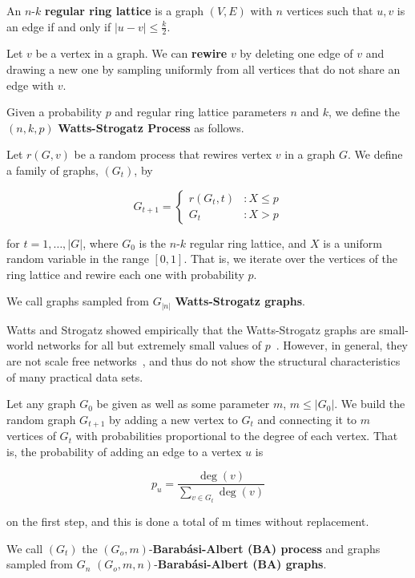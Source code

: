 \begin{definition}
  An $n$-$k$ \textbf{regular ring lattice} is a graph $(V, E)$ with $n$ vertices
  such that $u,v$ is an edge if and only if $|u-v| \leq \frac{k}{2}$.
\end{definition}

\begin{definition}
  Let $v$ be a vertex in a graph. We can \textbf{rewire} $v$ by deleting one
  edge of $v$ and drawing a new one by sampling uniformly from all vertices that
  do not share an edge with $v$.
\end{definition}

\begin{definition}
  Given a probability $p$ and regular ring lattice parameters $n$ and $k$, we
  define the $(n,k,p)$ \textbf{Watts-Strogatz Process} as follows.

  Let $r(G,v)$ be a random process that rewires vertex $v$ in a graph $G$. We
  define a family of graphs, $(G_t)$, by

  \[
    G_{t+1} = \left\{
      \begin{array}{lc}
        r(G_t,t) &: X \leq p \\
        G_t &: X > p
      \end{array}
    \right.
  \]

  for $t = 1,\dots, |G|$, where $G_0$ is the $n$-$k$ regular ring lattice, and
  $X$ is a uniform random variable in the range $[0,1]$. That is, we iterate
  over the vertices of the ring lattice and rewire each one with probability
  $p$.

  We call graphs sampled from $G_{|n|}$ \textbf{Watts-Strogatz graphs}.
\end{definition}

Watts and Strogatz showed empirically that the Watts-Strogatz graphs are small-world networks for all
but extremely small values of $p$~\cite{Watts1998Collective}. However, in general, they are not scale
free networks~\cite{Barabasi509}, and thus do not show the structural characteristics of many
practical data sets.

\begin{definition}
  \label{def:ba}
  Let any graph $G_0$ be given as well as some parameter $m$, $m \leq |G_0|$. We
  build the random graph $G_{t+1}$ by adding a new vertex to $G_t$ and
  connecting it to $m$ vertices of $G_t$ with probabilities proportional to the
  degree of each vertex. That is, the probability of adding an edge to a vertex
  $u$ is

  \[
    p_u = \frac{\deg(v)}{\sum_{v \in G_t} \deg(v)}
  \]

  on the first step, and this is done a total of m times without replacement.

  We call $(G_t)$ the $(G_o,m)$-\textbf{Barab\'asi-Albert (BA) process} and graphs
  sampled from $G_n$ $(G_o,m,n)$-\textbf{Barab\'asi-Albert (BA) graphs}.
\end{definition}

